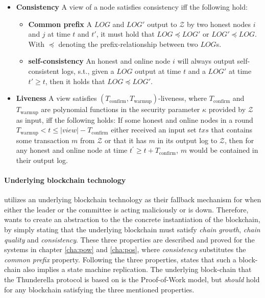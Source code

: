 \begin{itemize}
    \item \textbf{Consistency} A view of a node satisfies consistency iff the following hold:
    \begin{itemize}
        \item \textbf{Common prefix} A $LOG$ and $LOG'$ output to $\mathcal{Z}$ by two honest nodes $i$ and $j$ at time $t$ and $t'$, it must hold that $LOG \preceq LOG'$ or $LOG' \preceq LOG$. With $\preceq$ denoting the prefix-relationship between two $LOG$s.
        \item \textbf{self-consistency} An honest and online node $i$ will always output self-consistent logs, s.t., given a $LOG$ output at time $t$ and a $LOG'$ at time $t' \geq t$, then it holds that $LOG \preceq LOG'$.
    \end{itemize}
    \item \textbf{Liveness} A view satisfies $(T_\text{confirm},T_\text{warmup})$-liveness, where $T_\text{confirm}$ and $T_\text{warmup}$ are polynomial functions in the security parameter $\kappa$ provided by $\mathcal{Z}$ as input, iff the following holds: If some honest and online nodes in a round $T_\text{warmup} < t \leq |view|-T_\text{confirm}$ either received an input set $txs$ that contains some transaction $m$ from $\mathcal{Z}$ or that it has $m$ in its output log to $\mathcal{Z}$, then for any honest and online node at time $t^{'} \geq t+T_\text{confirm}$, $m$ would be contained in their output log.
\end{itemize}

\paragraph{Underlying blockchain technology} \cite{thunderella} utilizes an underlying blockchain technology as their fallback mechanism for when either the leader or the committee is acting maliciously or is down. Therefore, \cite{thunderella} wants to create an abstraction to the the concrete instantiation of the blockchain, by simply stating that the underlying blockchain must satisfy \emph{chain growth}, \emph{chain quality} and \emph{consistency}. These three properties are described and proved for the systems in chapter \ref{cha:pow} and \ref{cha:pos}, where \emph{consistency} substitutes the \emph{common prefix} property. Following the three properties, \cite{thunderella} states that such a block-chain also implies a state machine replication. The underlying block-chain that the Thunderella protocol is based on is the Proof-of-Work model, but \emph{should} hold for any blockchain satisfying the three mentioned properties.\\

